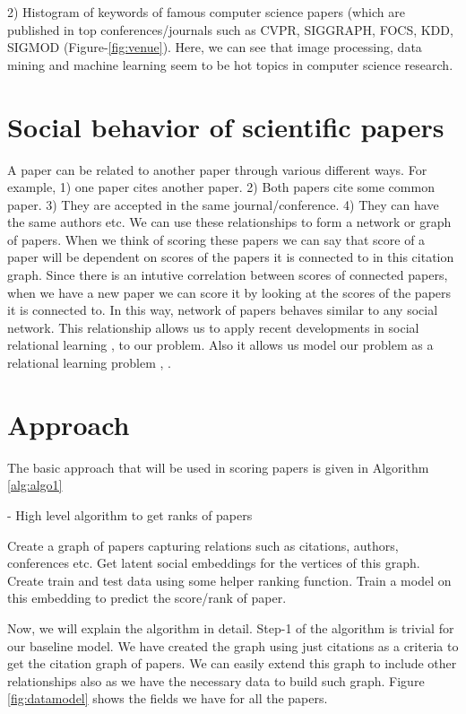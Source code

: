 \documentclass[a4paper, 11pt]{article}
\begin{document}
2) Histogram of keywords of famous computer science papers (which are published in top conferences/journals such as CVPR, SIGGRAPH, FOCS, KDD, SIGMOD (Figure-\ref{fig:venue}). Here, we can see that image processing, data mining and machine learning seem to be hot topics in computer science research.


\section{Social behavior of scientific papers}
A paper can be related to another paper through various different ways. For example, 1) one paper cites another paper. 2) Both papers cite some common paper. 3) They are accepted in the same journal/conference. 4) They can have the same authors etc. We can use these relationships to form a network or graph of papers. When we think of scoring these papers we can say that score of a paper will be dependent on scores of the papers it is connected to in this citation graph. Since there is an intutive correlation between scores of connected papers, when we have a new paper we can score it by looking at the scores of the papers it is connected to. In this way, network of papers behaves similar to any social network. This relationship allows us to apply recent developments in social relational learning \cite{deepwalk}, \cite{tang2011leveraging} to our problem. Also it allows us model our problem as a relational learning problem \cite{tang2009scalable}, \cite{tang2009relational}. 
\section{Approach}
The basic approach that will be used in scoring papers is given in Algorithm \ref{alg:algo1}
\begin{algorithm}
\caption{ - High level algorithm to get ranks of papers}
\label{alg:algo1}
\begin{algorithmic}[1]
\State Create a graph of papers capturing relations such as citations, authors, conferences etc.
\State Get latent social embeddings for the vertices of this graph. 
\State Create train and test data using some helper ranking function.
\State Train a model on this embedding to predict the score/rank of paper.
\end{algorithmic}
\end{algorithm}
Now, we will explain the algorithm in detail. Step-1 of the algorithm is trivial for our baseline model. We have created the graph using just citations as a criteria to get the citation graph of papers. We can easily extend this graph to include other relationships also as we have the necessary data to build such graph. Figure \ref{fig:datamodel} shows the fields we have for all the papers.
\end{document}
